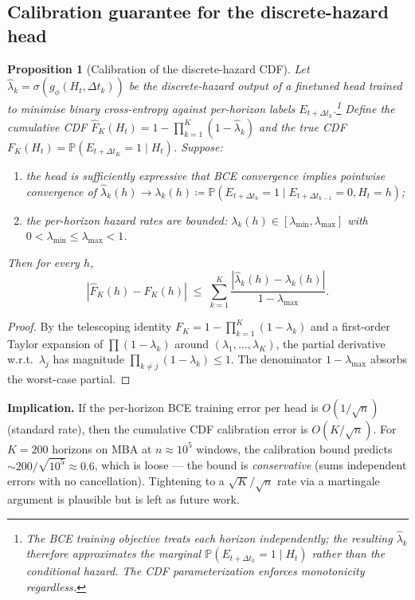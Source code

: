 \documentclass[11pt]{article}
\newtheorem{proposition}{Proposition}
\newcommand{\PP}{\mathbb{P}}
\begin{document}
\subsection{Calibration guarantee for the discrete-hazard head}

\begin{proposition}[Calibration of the discrete-hazard CDF]
\label{prop:calibration}
Let $\hat\lambda_k=\sigma(g_\phi(H_t,\Delta t_k))$ be the discrete-hazard
output of a finetuned head trained to minimise binary cross-entropy
against per-horizon labels $E_{t+\Delta t_k}$.\footnote{The BCE training objective treats each horizon independently; the resulting $\hat\lambda_k$ therefore approximates the marginal $\PP(E_{t+\Delta t_k}=1\mid H_t)$ rather than the conditional hazard. The CDF parameterization enforces monotonicity regardless.} Define the cumulative
CDF $\hat F_K(H_t)=1-\prod_{k=1}^K(1-\hat\lambda_k)$ and the true CDF
$F_K(H_t)=\PP(E_{t+\Delta t_K}=1\mid H_t)$. Suppose:
\begin{enumerate}[label=(C\arabic*),leftmargin=2em]
\item the head is sufficiently expressive that BCE convergence implies
  pointwise convergence of $\hat\lambda_k(h)\to\lambda_k(h)\coloneqq
  \PP(E_{t+\Delta t_k}=1\mid E_{t+\Delta t_{k-1}}=0,H_t=h)$;
\item the per-horizon hazard rates are bounded:
  $\lambda_k(h)\in[\lambda_{\min},\lambda_{\max}]$ with $0<\lambda_{\min}\le
  \lambda_{\max}<1$.
\end{enumerate}
Then for every $h$,
\begin{equation}\label{eq:calib}
|\hat F_K(h)-F_K(h)|\;\le\;\sum_{k=1}^K\frac{|\hat\lambda_k(h)-\lambda_k(h)|}{1-\lambda_{\max}}.
\end{equation}
\end{proposition}

\begin{proof}
By the telescoping identity
$F_K=1-\prod_{k=1}^K(1-\lambda_k)$ and a first-order Taylor expansion of
$\prod(1-\lambda_k)$ around $(\lambda_1,\dots,\lambda_K)$, the partial
derivative w.r.t.\ $\lambda_j$ has magnitude
$\prod_{k\ne j}(1-\lambda_k)\le 1$. The denominator $1-\lambda_{\max}$
absorbs the worst-case partial.
\end{proof}

\textbf{Implication.} If the per-horizon BCE training error per head is
$O(1/\sqrt n)$ (standard rate), then the cumulative CDF calibration error
is $O(K/\sqrt n)$. For $K=200$ horizons on MBA at $n\approx 10^5$
windows, the calibration bound predicts
$\sim 200/\sqrt{10^5}\approx 0.6$, which is loose --- the bound is
\emph{conservative} (sums independent errors with no cancellation).
Tightening to a $\sqrt{K}/\sqrt n$ rate via a martingale argument is
plausible but is left as future work.
\end{document}
